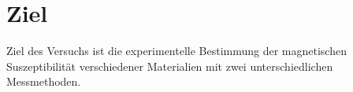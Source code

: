 \section{Ziel}
\label{sec:Ziel}

Ziel des Versuchs ist die experimentelle Bestimmung der magnetischen
Suszeptibilität verschiedener Materialien mit zwei unterschiedlichen Messmethoden. 
